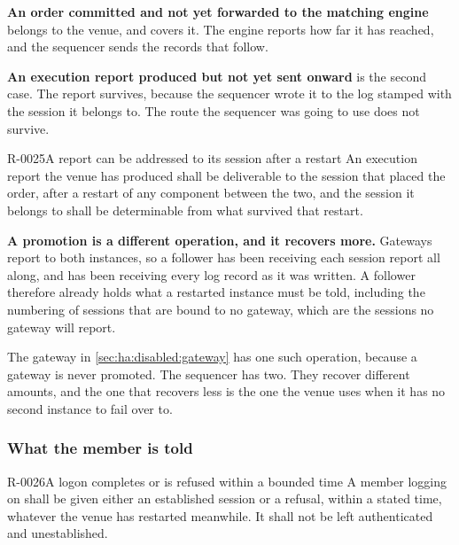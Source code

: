 \textbf{An order committed and not yet forwarded to the matching engine} belongs
to the venue, and  covers it. The engine reports how far it has
reached, and the sequencer sends the records that follow.

\textbf{An execution report produced but not yet sent onward} is the second
case. The report survives, because the sequencer wrote it to the log stamped with
the session it belongs to. The route the sequencer was going to use does not
survive.

\begin{requirement}{R-0025}{A report can be addressed to its session after a restart}
  An execution report the venue has produced shall be deliverable to the session
  that placed the order, after a restart of any component between the two, and
  the session it belongs to shall be determinable from what survived that
  restart.
\end{requirement}

\textbf{A promotion is a different operation, and it recovers more.} Gateways
report to both instances, so a follower has been receiving each session report
all along, and has been receiving every log record as it was written. A follower
therefore already holds what a restarted instance must be told, including the
numbering of sessions that are bound to no gateway, which are the sessions no
gateway will report.

The gateway in \cref{sec:ha:disabled:gateway} has one such operation, because a
gateway is never promoted. The sequencer has two. They recover different amounts,
and the one that recovers less is the one the venue uses when it has no second
instance to fail over to.

\subsubsection{What the member is told}
\label{sec:ha:disabled:sequencer:member}

\begin{requirement}{R-0026}{A logon completes or is refused within a bounded time}
  A member logging on shall be given either an established session or a refusal,
  within a stated time, whatever the venue has restarted meanwhile. It shall not
  be left authenticated and unestablished.
\end{requirement}

